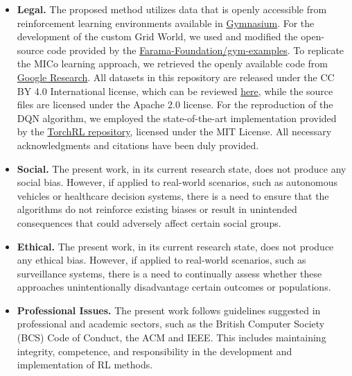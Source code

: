 \begin{itemize}
    \item \textbf{Legal.} The proposed method utilizes data that is openly accessible from reinforcement learning environments available in \href{https://gymnasium.farama.org/}{Gymnasium}. For the development of the custom Grid World, we used and modified the open-source code provided by the \href{https://github.com/Farama-Foundation/gym-examples/blob/main/gym_examples/envs/grid_world.py}{Farama-Foundation/gym-examples}. To replicate the MICo learning approach, we retrieved the openly available code from \href{https://github.com/google-research/google-research/tree/master/mico}{Google Research}. All datasets in this repository are released under the CC BY 4.0 International license, which can be reviewed \href{https://creativecommons.org/licenses/by/4.0/legalcode}{here}, while the source files are licensed under the Apache 2.0 license. For the reproduction of the DQN algorithm, we employed the state-of-the-art implementation provided by the \href{https://github.com/pytorch/rl/tree/main/sota-implementations/dqn}{TorchRL repository}, licensed under the MIT License. All necessary acknowledgments and citations have been duly provided.
    \item \textbf{Social.} The present work, in its current research state, does not produce any social bias. However, if applied to real-world scenarios, such as autonomous vehicles or healthcare decision systems, there is a need to ensure that the algorithms do not reinforce existing biases or result in unintended consequences that could adversely affect certain social groups. 
    \item \textbf{Ethical.} The present work, in its current research state, does not produce any ethical bias. However, if applied to real-world scenarios, such as surveillance systems, there is a need to continually assess whether these approaches unintentionally disadvantage certain outcomes or populations.
    \item \textbf{Professional Issues.} The present work follows guidelines suggested in professional and academic sectors, such as the British Computer Society (BCS) Code of Conduct, the ACM and IEEE. This includes maintaining integrity, competence, and responsibility in the development and implementation of RL methods.  
\end{itemize}

